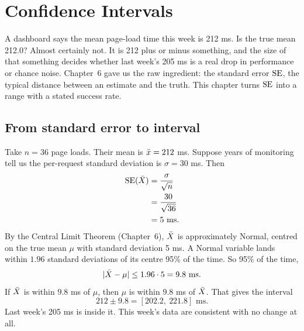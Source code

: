 \chapter{Confidence Intervals}
\label{ch:confidence-intervals}

A dashboard says the mean page-load time this week is 212 ms. Is the true
mean 212.0? Almost certainly not. It is 212 plus or minus something, and the
size of that something decides whether last week's 205 ms is a real
drop in performance or chance noise. Chapter~6 gave us the raw ingredient: the standard error
$\operatorname{SE}$, the typical distance between an estimate and the truth. This chapter
turns $\operatorname{SE}$ into a range with a stated success rate.

\section{From standard error to interval}
\label{sec:ci-from-se}

Take $n=36$ page loads. Their mean is $\bar{x} = 212$ ms. Suppose years of
monitoring tell us the per-request standard deviation is $\sigma = 30$ ms.
Then
\begin{align*}
  \operatorname{SE}(\bar{X}) &= \frac{\sigma}{\sqrt n} \\
             &= \frac{30}{\sqrt{36}} \\
             &= 5 \text{ ms}.
\end{align*}
By the Central Limit Theorem (Chapter~6), $\bar{X}$ is approximately Normal,
centred on the true mean $\mu$ with standard deviation 5 ms. A Normal variable
lands within $1.96$ standard deviations of its centre 95\% of the time. So
95\% of the time,
\[
  \lvert\bar{X} - \mu\rvert \le 1.96 \cdot 5 = 9.8 \text{ ms}.
\]
If $\bar{X}$ is within 9.8 ms of $\mu$, then $\mu$ is within 9.8 ms of $\bar{X}$.
That gives the interval
\[
  212 \pm 9.8 = [202.2,\ 221.8] \text{ ms}.
\]
Last week's 205 ms is inside it. This week's data are consistent with no
change at all.

